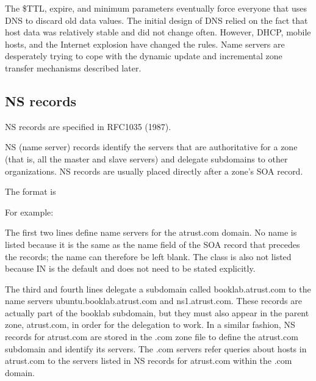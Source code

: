 The {\$TTL}, {expire}, and {minimum} parameters eventually force
everyone that uses DNS to discard old data values. The initial design of
DNS relied on the fact that host data was relatively stable and did not
change often. However, DHCP, mobile hosts, and the Internet explosion
have changed the rules. Name servers are desperately trying to cope with
the dynamic update and incremental zone transfer mechanisms described
later.

\protect\hypertarget{part0024_split_023.html}{}{}

\hypertarget{part0024_split_023.htmlux5cux23_idContainer1069}{}
\hypertarget{part0024_split_023.htmlux5cux23calibre_pb_22}{%
\subsection[NS
records]{\texorpdfstring{\protect\hypertarget{part0024_split_023.htmlux5cux23_idTextAnchor874}{}{}\protect\hypertarget{part0024_split_023.htmlux5cux23_idIndexMarker2070}{}{}NS
records}{NS records}}\label{part0024_split_023.htmlux5cux23calibre_pb_22}}

\leavevmode\hypertarget{part0024_split_023.htmlux5cux23_idContainer937}{}%
NS records are specified in RFC1035 (1987).

NS (name server) records
\protect\hypertarget{part0024_split_023.htmlux5cux23_idIndexMarker2071}{}{}identify
the servers that are authoritative for a zone (that is, all the master
and slave servers) and delegate subdomains to other organizations. NS
records are usually placed directly after a zone's SOA record.

The format is


For example:


The first two lines define name servers for the atrust.com domain. No
{name} is listed because it is the same as the {name} field of the SOA
record that precedes the records; the {name} can therefore be left
blank. The {class} is also not listed because IN is the default and does
not need to be stated explicitly.

The third and fourth lines delegate a subdomain called
booklab.atrust.com to the name servers ubuntu.booklab.atrust.com and
ns1.atrust.com. These records are actually part of the booklab
subdomain, but they must also appear in the parent zone, atrust.com, in
order for the delegation to work. In a similar fashion, NS records for
atrust.com are stored in the .com zone file to define the atrust.com
subdomain and identify its servers. The .com servers refer queries about
hosts in atrust.com to the servers listed in NS records for atrust.com
within the .com domain.

